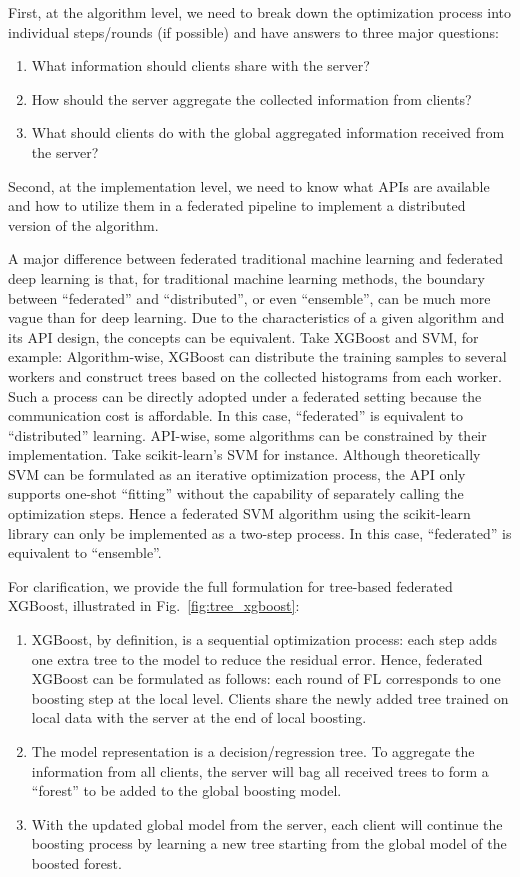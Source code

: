 \documentclass[11pt]{article}
\begin{document}
First, at the algorithm level, we need to break down the optimization process into individual steps/rounds (if possible) and have answers to three major questions:
\begin{enumerate}
    \item What information should clients share with the server?
    \item How should the server aggregate the collected information from clients?
    \item What should clients do with the global aggregated information received from the server?
\end{enumerate}

Second, at the implementation level, we need to know what APIs are available and how to utilize them in a federated pipeline to implement a distributed version of the algorithm.

A major difference between federated traditional machine learning and federated deep learning is that, for traditional machine learning methods, the boundary between ``federated'' and ``distributed'', or even ``ensemble'', can be much more vague than for deep learning. Due to the characteristics of a given algorithm and its API design, the concepts can be equivalent. Take XGBoost and SVM, for example:
Algorithm-wise, XGBoost can distribute the training samples to several workers and construct trees based on the collected histograms from each worker. Such a process can be directly adopted under a federated setting because the communication cost is affordable. In this case, ``federated'' is equivalent to ``distributed'' learning.
API-wise, some algorithms can be constrained by their implementation. Take scikit-learn's SVM for instance. Although theoretically SVM can be formulated as an iterative optimization process, the API only supports one-shot ``fitting'' without the capability of separately calling the optimization steps. Hence a federated SVM algorithm using the scikit-learn library can only be implemented as a two-step process. In this case, ``federated'' is equivalent to ``ensemble''.

For clarification, we provide the full formulation for tree-based federated XGBoost, illustrated in Fig.~\ref{fig:tree_xgboost}:
\begin{enumerate}
\item XGBoost, by definition, is a sequential optimization process: each step adds one extra tree to the model to reduce the residual error. Hence, federated XGBoost can be formulated as follows: each round of FL corresponds to one boosting step at the local level. Clients share the newly added tree trained on local data with the server at the end of local boosting.
\item The model representation is a decision/regression tree. To aggregate the information from all clients, the server will bag all received trees to form a ``forest'' to be added to the global boosting model.
\item With the updated global model from the server, each client will continue the boosting process by learning a new tree starting from the global model of the boosted forest.
\end{enumerate}
\end{document}
